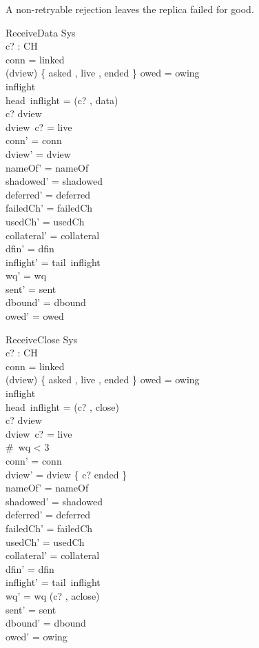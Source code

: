 \documentclass[a4paper,10pt,fleqn]{article}
\begin{document}
A non-retryable rejection leaves the replica failed for good.

\begin{schema}{ReceiveData}
  \Delta Sys \\
  c? : CH \\
\where
  conn = linked \\
  (\ran dview) \cap \{ asked , live , ended \} \neq \emptyset \lor owed = owing \\
  inflight \neq \langle \rangle \\
  head~inflight = (c? , data) \\
  c? \in \dom dview \\
  dview~c? = live \\
  conn' = conn \\
  dview' = dview \\
  nameOf' = nameOf \\
  shadowed' = shadowed \\
  deferred' = deferred \\
  failedCh' = failedCh \\
  usedCh' = usedCh \\
  collateral' = collateral \\
  dfin' = dfin \\
  inflight' = tail~inflight \\
  wq' = wq \\
  sent' = sent \\
  dbound' = dbound \\
  owed' = owed
\end{schema}

\begin{schema}{ReceiveClose}
  \Delta Sys \\
  c? : CH \\
\where
  conn = linked \\
  (\ran dview) \cap \{ asked , live , ended \} \neq \emptyset \lor owed = owing \\
  inflight \neq \langle \rangle \\
  head~inflight = (c? , close) \\
  c? \in \dom dview \\
  dview~c? = live \\
  \#~wq < 3 \\
  conn' = conn \\
  dview' = dview \oplus \{ c? \mapsto ended \} \\
  nameOf' = nameOf \\
  shadowed' = shadowed \\
  deferred' = deferred \\
  failedCh' = failedCh \\
  usedCh' = usedCh \\
  collateral' = collateral \\
  dfin' = dfin \\
  inflight' = tail~inflight \\
  wq' = wq \cat \langle (c? , aclose) \rangle \\
  sent' = sent \\
  dbound' = dbound \\
  owed' = owing
\end{schema}
\end{document}
